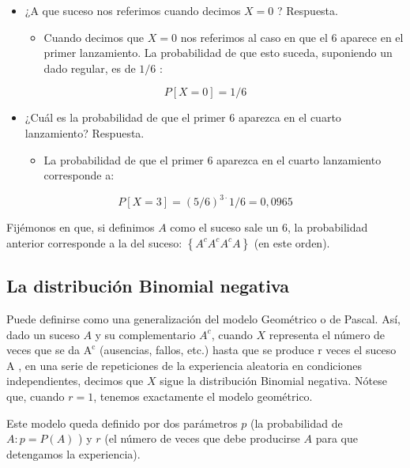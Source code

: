 \documentclass[
  a4paper,
  DIV=11,
  numbers=noendperiod]{scrreprt}
\providecommand{\tightlist}{%
  \setlength{\itemsep}{0pt}\setlength{\parskip}{0pt}}\usepackage{longtable,booktabs,array}
\begin{document}
\begin{itemize}
\item
  ¿A que suceso nos referimos cuando decimos \(X=0\) ? Respuesta.

  \begin{itemize}
  \tightlist
  \item
    Cuando decimos que \(X=0\) nos referimos al caso en que el 6 aparece
    en el primer lanzamiento. La probabilidad de que esto suceda,
    suponiendo un dado regular, es de \(1 / 6\) :
  \end{itemize}
\end{itemize}

\[
P[X=0]=1 / 6
\]

\begin{itemize}
\item
  ¿Cuál es la probabilidad de que el primer 6 aparezca en el cuarto
  lanzamiento? Respuesta.

  \begin{itemize}
  \tightlist
  \item
    La probabilidad de que el primer 6 aparezca en el cuarto lanzamiento
    corresponde a:
  \end{itemize}
\end{itemize}

\[
P[X=3]=(5 / 6)^{3 \cdot} 1 / 6=0,0965
\]

Fijémonos en que, si definimos \(A\) como el suceso sale un 6, la
probabilidad anterior corresponde a la del suceso:
\(\left\{A^{c} A^{c} A^{c} A\right\}\) (en este orden).

\subsection{La distribución Binomial
negativa}\label{la-distribuciuxf3n-binomial-negativa}

Puede definirse como una generalización del modelo Geométrico o de
Pascal. Así, dado un suceso \(A\) y su complementario \(A^{c}\), cuando
\(X\) representa el número de veces que se da
\(\mathrm{A}^{\mathrm{c}}\) (ausencias, fallos, etc.) hasta que se
produce r veces el suceso A , en una serie de repeticiones de la
experiencia aleatoria en condiciones independientes, decimos que \(X\)
sigue la distribución Binomial negativa. Nótese que, cuando \(r=1\),
tenemos exactamente el modelo geométrico.

Este modelo queda definido por dos parámetros \(p\) (la probabilidad de
\(A: p=P(A)\) ) y \(r\) (el número de veces que debe producirse \(A\)
para que detengamos la experiencia).
\end{document}

